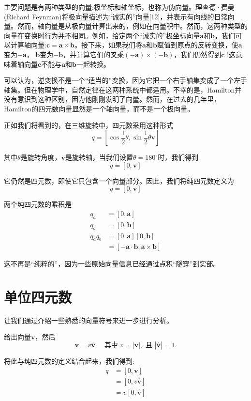 主要问题是有两种类型的向量:极坐标和轴坐标，也称为伪向量。理查德·费曼(Richard Feynman)将极向量描述为“诚实的”向量[12]，并表示有向线的日常向量。然而，轴向量是从极向量计算出来的，例如在向量积中。然而，这两种类型的向量在变换时行为并不相同。例如，给定两个“诚实的”极坐标向量$\mathbf{a}$和$\mathbf{b}$，我们可以计算轴向量:$\mathbf{c}=\mathbf{a} \times\mathbf{b}$。接下来，如果我们将$\mathbf{a}$和$\mathbf{b}$赋值到原点的反转变换，使$\mathbf{a}$变为$-\mathbf{a}$， $\mathbf{b}$变为$-\mathbf{b}$，并计算它们的叉乘$(-\mathbf{a}) \times(-\mathbf{b})$，我们仍然得到$\mathbf{c}$ !这意味着轴向量$\mathbf{c}$不能与$\mathbf{a}$和$\mathbf{b}$一起转换。

可以认为，逆变换不是一个“适当的”变换，因为它把一个右手轴集变成了一个左手轴集。但在物理学中，自然定律在这两种系统中都适用。不幸的是，Hamilton并没有意识到这种区别，因为他刚刚发明了向量。然而，在过去的几年里，Hamilton的四元数向量显然是一个轴向量，而不是一个极向量。

正如我们将看到的，在三维旋转中，四元数采用这种形式
$$
q=\left[\cos \frac{1}{2} \theta, \sin \frac{1}{2} \theta \mathbf{v}\right]
$$

其中$\theta$是旋转角度，$\mathbf{v}$是旋转轴，当我们设置$\theta=180^{\circ}$时，我们得到
$$
q=[0, \mathbf{v}]
$$

它仍然是四元数，即使它只包含一个向量部分。因此，我们将纯四元数定义为
$$
q=[0, \mathbf{v}]
$$

两个纯四元数的乘积是
$$
\begin{aligned}
q_{a} & =[0, \mathbf{a}] \\
q_{b} & =[0, \mathbf{b}] \\
q_{a} q_{b} & =[0, \mathbf{a}][0, \mathbf{b}] \\
& =[-\mathbf{a} \cdot \mathbf{b}, \mathbf{a} \times \mathbf{b}]
\end{aligned}
$$

这不再是“纯粹的”，因为一些原始向量信息已经通过点积“隧穿”到实部。

\section{单位四元数}
让我们通过介绍一些熟悉的向量符号来进一步进行分析。

给出向量$\mathbf{v}$，然后
$$
\mathbf{v}=v \hat{\mathbf{v}} \quad \text { 其中 } v=|\mathbf{v}|, \text { 且 }|\hat{\mathbf{v}}|=1 .
$$

将此与纯四元数的定义结合起来，我们得到:
$$
\begin{aligned}
q & =[0, \mathbf{v}] \\
& =[0, v \hat{\mathbf{v}}] \\
& =v[0, \hat{\mathbf{v}}]
\end{aligned}
$$

